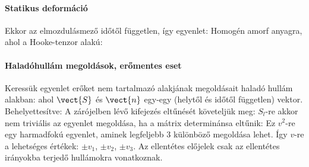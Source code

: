    \paragraph{Statikus deformáció}
    
    Ekkor az elmozdulásmező időtől független, így  egyenlet:
    Homogén amorf anyagra, ahol a Hooke-tenzor  alakú:
    
   \paragraph{Haladóhullám megoldások, erőmentes eset}
    
    Keressük  egyenlet erőket nem tartalmazó alakjának megoldásait haladó hullám alakban:
    ahol $\vect{S}$ és $\vect{n}$ egy-egy (helytől és időtől független) vektor.
   Behelyettesítve:
    A zárójelben lévő kifejezés eltűnését követeljük meg:
    $S_l$-re akkor nem triviális az egyenlet megoldása, ha a mátrix determinánsa eltűnik:
    Ez $v^2$-re egy harmadfokú egyenlet, aminek legfeljebb 3 különböző megoldása lehet. Így $v$-re a lehetséges értékek: $\pm v_1$, $\pm v_2$, $\pm v_3$.
   Az ellentétes előjelek csak az ellentétes irányokba terjedő hullámokra vonatkoznak. 
    
